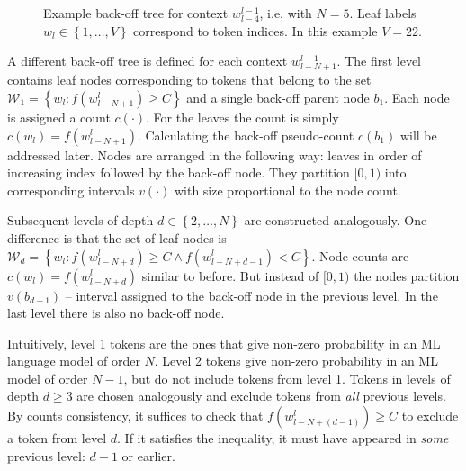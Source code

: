 \documentclass[draft]{IIBproject}
\makeatletter
\newcommand*{\ie}{i.e.\@\xspace}
\makeatother
\begin{document}
\begin{figure}[h]
\caption{\label{fig:backoff_tree}Example back-off tree for context $w_{l-4}^{l-1}$, \ie with $N=5$. Leaf labels $w_l \in \left\{ 1, \dots, V \right\}$ correspond to token indices. In this example $V=22$.}
\end{figure}

A different back-off tree is defined for each context $w_{l-N+1}^{l-1}$. The first level contains leaf nodes corresponding to tokens that belong to the set $\mathcal W_1 = \left\{ w_l : f(w_{l-N+1}^l) \ge C \right\}$ and a single back-off parent node $b_1$. Each node is assigned a count $c(\cdot)$. For the leaves the count is simply $c(w_l) = f(w_{l-N+1}^l)$. Calculating the back-off pseudo-count $c(b_1)$ will be addressed later. Nodes are arranged in the following way: leaves in order of increasing index followed by the back-off node. They partition $[0,1)$ into corresponding intervals $v(\cdot)$ with size proportional to the node count.

Subsequent levels of depth $d \in \left\{ 2, \dots, N \right\}$ are constructed analogously. One difference is that the set of leaf nodes is $\mathcal W_d = \left\{ w_l : f(w_{l-N+d}^l) \ge C \land f(w_{l-N+d-1}^l) < C \right\}$. Node counts are $c(w_l) = f(w_{l-N+d}^l)$ similar to before. But instead of $[0,1)$ the nodes partition $v(b_{d-1})$ -- interval assigned to the back-off node in the previous level. In the last level there is also no back-off node.

Intuitively, level 1 tokens are the ones that give non-zero probability in an ML language model of order $N$. Level 2 tokens give non-zero probability in an ML model of order $N-1$, but do not include tokens from level 1. Tokens in levels of depth $d \ge 3$ are chosen analogously and exclude tokens from \emph{all} previous levels. By counts consistency, it suffices to check that $f(w_{l-N+(d-1)}^l) \ge C$ to exclude a token from level $d$. If it satisfies the inequality, it must have appeared in \emph{some} previous level: $d-1$ or earlier.
\end{document}
